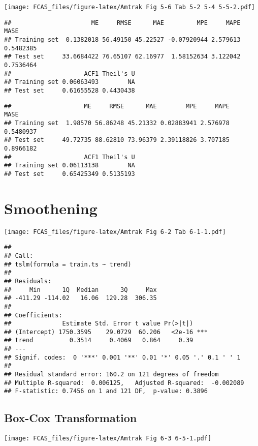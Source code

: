 \documentclass[]{article}
\begin{document}
\texttt{[image: FCAS\_files/figure-latex/Amtrak Fig 5-6 Tab 5-2 5-4 5-5-2.pdf]}

\begin{verbatim}
##                      ME     RMSE      MAE         MPE     MAPE      MASE
## Training set  0.1382018 56.49150 45.22527 -0.07920944 2.579613 0.5482385
## Test set     33.6684422 76.65107 62.16977  1.58152634 3.122042 0.7536464
##                    ACF1 Theil's U
## Training set 0.06063493        NA
## Test set     0.61655528 0.4430438
\end{verbatim}

\begin{verbatim}
##                    ME     RMSE      MAE        MPE     MAPE      MASE
## Training set  1.98570 56.86248 45.21332 0.02883941 2.576978 0.5480937
## Test set     49.72735 88.62810 73.96379 2.39118826 3.707185 0.8966182
##                    ACF1 Theil's U
## Training set 0.06113138        NA
## Test set     0.65425349 0.5135193
\end{verbatim}

\section{Smoothening}\label{smoothening-1}

\texttt{[image: FCAS\_files/figure-latex/Amtrak Fig 6-2 Tab 6-1-1.pdf]}

\begin{verbatim}
## 
## Call:
## tslm(formula = train.ts ~ trend)
## 
## Residuals:
##     Min      1Q  Median      3Q     Max 
## -411.29 -114.02   16.06  129.28  306.35 
## 
## Coefficients:
##              Estimate Std. Error t value Pr(>|t|)    
## (Intercept) 1750.3595    29.0729  60.206   <2e-16 ***
## trend          0.3514     0.4069   0.864     0.39    
## ---
## Signif. codes:  0 '***' 0.001 '**' 0.01 '*' 0.05 '.' 0.1 ' ' 1
## 
## Residual standard error: 160.2 on 121 degrees of freedom
## Multiple R-squared:  0.006125,   Adjusted R-squared:  -0.002089 
## F-statistic: 0.7456 on 1 and 121 DF,  p-value: 0.3896
\end{verbatim}

\subsection{Box-Cox Transformation}\label{box-cox-transformation}

\texttt{[image: FCAS\_files/figure-latex/Amtrak Fig 6-3 6-5-1.pdf]}
\end{document}
